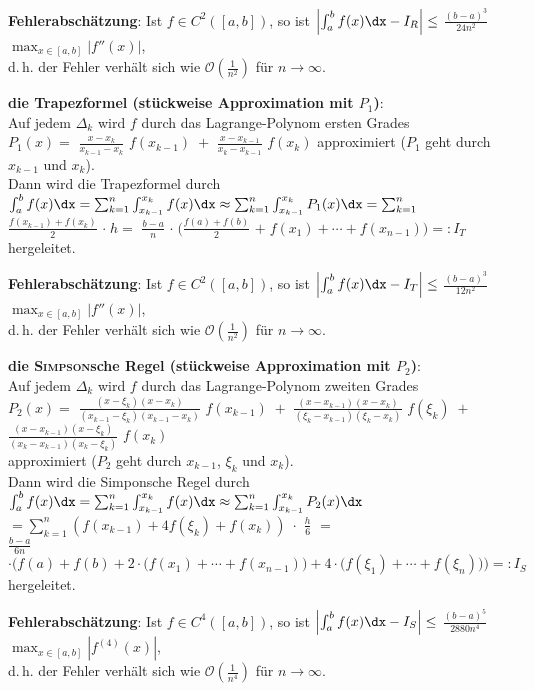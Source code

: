 \textbf{Fehlerabschätzung}: Ist $f \in C^2([a,b])$, so ist
$\left|\int_a^b f(x)\dx - I_R\right| \le$
{\large $\frac{(b - a)^3}{24n^2}$}
$\max_{x \in [a,b]} |f''(x)|$, \\
d.\,h. der Fehler verhält sich wie $\mathcal{O}(\frac{1}{n^2})$ für
$n \to \infty$.

\linie

\textbf{die Trapezformel (stückweise Approximation mit $P_1$)}: \\
Auf jedem $\Delta_k$ wird $f$ durch das Lagrange-Polynom ersten Grades \\
$P_1(x) =$ {\large $\frac{x - x_k}{x_{k-1} - x_k}$} $f(x_{k-1}) \;+$
{\large $\frac{x - x_{k-1}}{x_k - x_{k-1}}$} $f(x_k)$ approximiert
($P_1$ geht durch $x_{k-1}$ und $x_k$). \\
Dann wird die Trapezformel durch
$\int_a^b f(x)\dx = \sum_{k=1}^n \int_{x_{k-1}}^{x_k} f(x)\dx
\approx \sum_{k=1}^n \int_{x_{k-1}}^{x_k} P_1(x)\dx
= \sum_{k=1}^n$ {\large $\frac{f(x_{k-1}) + f(x_k)}{2}$} $\cdot\; h
=$ {\large $\frac{b - a}{n}$} $\cdot\; \Big(${\large $\frac{f(a) + f(b)}{2}$}
$+\; f(x_1) + \cdots + f(x_{n-1})\Big) =: I_T$ hergeleitet.

\textbf{Fehlerabschätzung}: Ist $f \in C^2([a,b])$, so ist
$\left|\int_a^b f(x)\dx - I_T\right| \le$
{\large $\frac{(b - a)^3}{12n^2}$}
$\max_{x \in [a,b]} |f''(x)|$, \\
d.\,h. der Fehler verhält sich wie $\mathcal{O}(\frac{1}{n^2})$ für
$n \to \infty$.

\linie

\textbf{die \textsc{Simpson}sche Regel (stückweise Approximation mit $P_2$)}:
\\
Auf jedem $\Delta_k$ wird $f$ durch das Lagrange-Polynom zweiten Grades \\
$P_2(x) =$ {\large $\frac{(x - \xi_k)(x - x_k)}
{(x_{k-1} - \xi_k)(x_{k-1} - x_k)}$} $f(x_{k-1}) \;+$
{\large $\frac{(x - x_{k-1})(x - x_k)}
{(\xi_k - x_{k-1})(\xi_k - x_k)}$} $f(\xi_k) \;+$
{\large $\frac{(x - x_{k-1})(x - \xi_k)}
{(x_k - x_{k-1})(x_k - \xi_k)}$} $f(x_k)$ \\
approximiert ($P_2$ geht durch $x_{k-1}$, $\xi_k$ und $x_k$). \\
Dann wird die Simponsche Regel durch
$\int_a^b f(x)\dx = \sum_{k=1}^n \int_{x_{k-1}}^{x_k} f(x)\dx
\approx \sum_{k=1}^n \int_{x_{k-1}}^{x_k} P_2(x)\dx$\\
$= \sum_{k=1}^n (f(x_{k-1}) + 4f(\xi_k) + f(x_k)) \;\cdot$
{\large $\frac{h}{6}$} $=$ \\
{\large $\frac{b - a}{6n}$} $\cdot \Big(f(a) + f(b) +
2 \cdot \big(f(x_1) + \cdots + f(x_{n-1})\big) +
4 \cdot \big(f(\xi_1) + \cdots + f(\xi_n)\big)\Big) =: I_S$ hergeleitet.

\textbf{Fehlerabschätzung}: Ist $f \in C^4([a,b])$, so ist
$\left|\int_a^b f(x)\dx - I_S\right| \le$
{\large $\frac{(b - a)^5}{2880n^4}$}
$\max_{x \in [a,b]} |f^{(4)}(x)|$, \\
d.\,h. der Fehler verhält sich wie $\mathcal{O}(\frac{1}{n^4})$ für
$n \to \infty$.

\pagebreak
